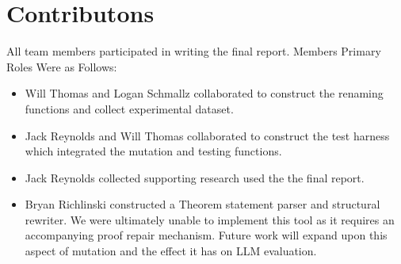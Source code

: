 \section{Contributons}

All team members participated in writing the final report. 
Members Primary Roles Were as Follows:
\begin{itemize}
    \item  Will Thomas and Logan Schmallz collaborated to construct the renaming functions and collect experimental dataset.
\item Jack Reynolds and Will Thomas collaborated to construct the test harness which integrated the mutation and testing functions.
\item Jack Reynolds collected supporting research used the the final report.
\item Bryan Richlinski constructed a Theorem statement parser and structural rewriter. We were ultimately unable to implement
this tool as it requires an accompanying proof repair mechanism. Future work will expand upon this aspect of mutation and 
the effect it has on LLM evaluation. 

\end{itemize}